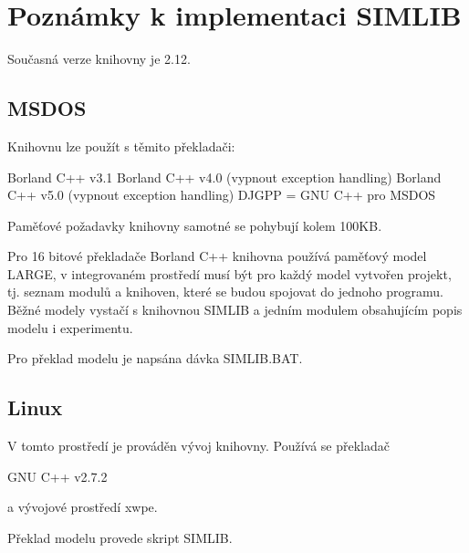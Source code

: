 \documentclass[a4paper]{article}
\begin{document}
\section{Poznámky k implementaci SIMLIB}

Současná verze  knihovny je 2.12.  

\subsection{MSDOS}

Knihovnu lze použít  s těmito překladači:

   Borland C++ v3.1 
   Borland C++ v4.0 (vypnout exception handling)
   Borland C++ v5.0 (vypnout exception handling)
   DJGPP = GNU C++ pro MSDOS

Paměťové požadavky knihovny samotné se pohybují kolem 100KB.

Pro 16 bitové překladače Borland C++ knihovna používá paměťový  model 
LARGE, v integrovaném  prostředí  musí  být  pro  každý  model vytvořen
projekt, tj.  seznam modulů a knihoven,  které se budou spojovat do  jednoho
programu.  Běžné modely  vystačí s  knihovnou SIMLIB a jedním modulem
obsahujícím popis modelu i experimentu.

Pro překlad modelu je napsána dávka SIMLIB.BAT.


\subsection{Linux}

V tomto prostředí je prováděn vývoj knihovny. Používá se překladač

   GNU C++ v2.7.2 

a vývojové prostředí xwpe.

Překlad modelu provede skript SIMLIB.
\end{document}
